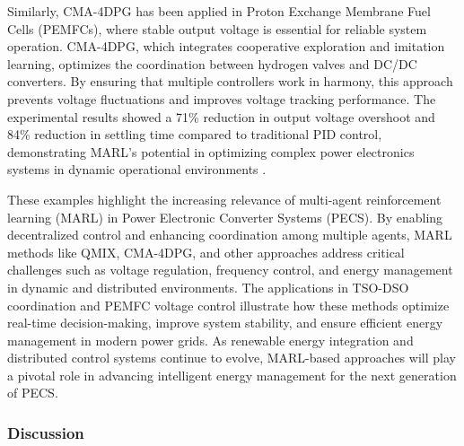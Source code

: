 Similarly, CMA-4DPG has been applied in Proton Exchange Membrane Fuel Cells (PEMFCs), where stable output voltage is essential for reliable system operation. CMA-4DPG, which integrates cooperative exploration and imitation learning, optimizes the coordination between hydrogen valves and DC/DC converters. By ensuring that multiple controllers work in harmony, this approach prevents voltage fluctuations and improves voltage tracking performance. The experimental results showed a 71\% reduction in output voltage overshoot and 84\% reduction in settling time compared to traditional PID control, demonstrating MARL's potential in optimizing complex power electronics systems in dynamic operational environments \cite{li2023large}.

These examples highlight the increasing relevance of multi-agent reinforcement learning (MARL) in Power Electronic Converter Systems (PECS). By enabling decentralized control and enhancing coordination among multiple agents, MARL methods like QMIX, CMA-4DPG, and other approaches address critical challenges such as voltage regulation, frequency control, and energy management in dynamic and distributed environments. The applications in TSO-DSO coordination and PEMFC voltage control illustrate how these methods optimize real-time decision-making, improve system stability, and ensure efficient energy management in modern power grids. As renewable energy integration and distributed control systems continue to evolve, MARL-based approaches will play a pivotal role in advancing intelligent energy management for the next generation of PECS.

\subsubsection{Discussion}

